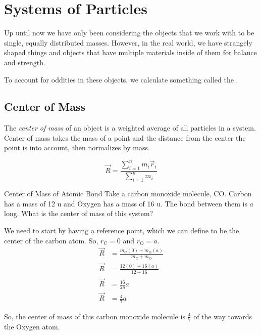 \section{Systems of Particles}\label{sec:Systems of Particles}
Up until now we have only been considering the objects that we work with to be single, equally distributed masses.
However, in the real world, we have strangely shaped things and objects that have multiple materials inside of them for balance and strength.

To account for oddities in these objects, we calculate something called the .

\subsection{Center of Mass}\label{subsec:Center of Mass}
\begin{definition}\label{def:Center of Mass}
  The \emph{center of mass} of an object is a weighted average of all particles in a system.
  Center of mass takes the mass of a point and the distance from the center the point is into account, then normalizes by mass.

  \begin{equation}\label{eq:Center of Mass}
    \vec{R} = \frac{\sum\limits_{i=1}^{n} m_{i} \vec{r}_{i}}{\sum\limits_{i=1}^{n} m_{i}}
  \end{equation}
\end{definition}

\begin{example}[]{Center of Mass of Atomic Bond}
  Take a carbon monoxide molecule, CO.
  Carbon has a mass of 12 \si{\atomicmassunit} and Oxygen has a mass of 16 \si{\atomicmassunit}.
  The bond between them is $a$ long.
  What is the center of mass of this system?

  \tcblower

  We need to start by having a reference point, which we can define to be the center of the carbon atom.
  So, $r_{\text{C}} = 0$ and $r_{\text{O}} = a$.
  \begin{align*}
    \vec{R} &= \frac{m_{\text{C}} (0) + m_{\text{O}} (a)}{m_{\text{C}} + m_{\text{O}}} \\
    \vec{R} &= \frac{12 (0) + 16 (a)}{12 + 16} \\
    \vec{R} &= \frac{16}{28} a \\
    \vec{R} &= \frac{4}{7} a
  \end{align*}

  So, the center of mass of this carbon monoxide molecule is $\frac{4}{7}$ of the way towards the Oxygen atom.
\end{example}

